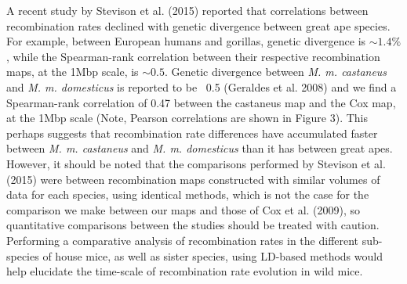 A recent study by Stevison et al. (2015) reported that correlations between recombination rates declined with genetic divergence between great ape species. For example, between European humans and gorillas, genetic divergence is $\sim1.4\%$, while the Spearman-rank correlation between their respective recombination maps, at the 1Mbp scale, is $\sim0.5$. Genetic divergence between \emph{M. m. castaneus} and \emph{M. m. domesticus} is reported to be ~0.5 (Geraldes et al. 2008) and we find a Spearman-rank correlation of 0.47 between the castaneus map and the Cox map, at the 1Mbp scale (Note, Pearson correlations are shown in Figure 3). This perhaps suggests that recombination rate differences have accumulated faster between \emph{M. m. castaneus} and \emph{M. m. domesticus} than it has between great apes. However, it should be noted that the comparisons performed by Stevison et al. (2015) were between recombination maps constructed with similar volumes of data for each species, using identical methods, which is not the case for the comparison we make between our maps and those of Cox et al. (2009), so quantitative comparisons between the studies should be treated with caution. Performing a comparative analysis of recombination rates in the different sub-species of house mice, as well as sister species, using LD-based methods would help elucidate the time-scale of recombination rate evolution in wild mice.

